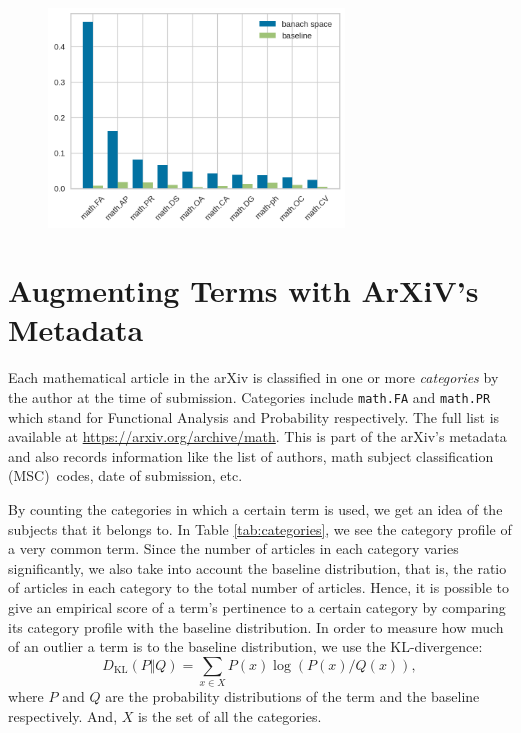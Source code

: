 \documentclass[submission,copyright,creativecommons]{eptcs}
\begin{document}
\begin{figure}[ht]
    \centering
    \includegraphics[width=0.7\textwidth]{images/barcomp.png}
\end{figure}

\section{Augmenting Terms with ArXiV's Metadata}
Each mathematical article in the arXiv is classified in one or more
\emph{categories}  by the author at
the time of submission. Categories include \texttt{math.FA} and  \texttt{math.PR} which stand for Functional Analysis and Probability respectively. The full list is available at \url{https://arxiv.org/archive/math}.
This is part of  the arXiv's metadata and also records information like the list of authors, math subject classification (MSC)~codes, date of submission, etc. 

By counting the categories in which a certain term is used, we get an
idea of the subjects that it belongs to. In Table
\ref{tab:categories}, we see the category profile of a very common
term. Since the number of articles in each category varies
significantly, we also take into account the baseline distribution,
that is, the ratio of articles in each category to the total number of
articles.
Hence, it is possible to give an empirical score of a term's
pertinence to a certain category by comparing its category profile
with the baseline distribution. In order to measure how much of an 
outlier a term is to the baseline distribution, we use the KL-divergence:
$$D_{\text{KL}}(P \Vert Q) = \sum_{x\in X} P(x)\log(P(x)/Q(x)),$$
where $P$ and $Q$ are the probability distributions of the term and the baseline respectively. And, $X$ is the set of all the categories.
\end{document}
